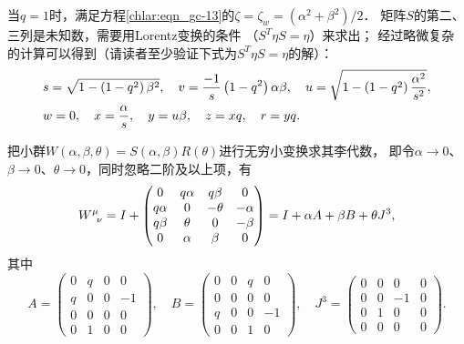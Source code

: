 当$q=1$时，满足方程\eqref{chlar:eqn_gc-13}的$\zeta=\zeta_w=(\alpha ^2 + \beta ^2)/2$．
矩阵$S$的第二、三列是未知数，需要用Lorentz变换的条件
（$S^T \eta S = \eta $）来求出；
经过略微复杂的计算可以得到（请读者至少验证下式为$S^T \eta S = \eta $的解）：
\begin{align}
	&s = \sqrt {1 - \left( {1 - {q^2}} \right){\beta ^2}}, \quad
	v = \frac{{ - 1}}{s}\left( {1 - {q^2}} \right)\alpha \beta , \quad
	u = \sqrt {1 - \left( {1 - {q^2}} \right)\frac{{{\alpha ^2}}}{{{s^2}}}},   \notag \\
	&w = 0,\quad x = \frac{\alpha }{s}, \quad y = u\beta,  \quad z = xq,\quad r = yq . 
	\label{chlar:eqn_gc-18}
\end{align}

把小群$W(\alpha,\beta,\theta) = S(\alpha,\beta)R(\theta)$进行无穷小变换求其李代数，
即令$\alpha  \to 0$、$\beta  \to 0$、$\theta  \to 0$，同时忽略二阶及以上项，有
\begin{equation}\label{chlar:eqn_gc-20}
	W^{\mu}_{\hphantom{\mu}\nu}= I + \begin{pmatrix}
		0&{q\alpha }&{q\beta }&0 \\
		{q\alpha }& 0&-\theta &{ - \alpha } \\
		{q\beta }&  {  \theta }&0&{ - \beta } \\
		0&  \alpha &\beta &0
	\end{pmatrix}
	= I + \alpha A + \beta B + \theta {J^3},
\end{equation}
其中
\begin{equation*} %
	A = \begin{pmatrix}
		0&q&0&0\\
		q&0&0&{ - 1} \\
		0&0&0&0 \\
		0&1&0&0
	\end{pmatrix},\quad B = \begin{pmatrix}
		0&0&q&0 \\
		0&0&0&0 \\
		q&0&0&{ - 1} \\
		0&0&1&0
	\end{pmatrix},\quad {J^3} = \begin{pmatrix}
		0&0&0&0 \\
		0&0&-1&0 \\
		0&{1}&0&0 \\
		0&0&0&0
	\end{pmatrix}.
\end{equation*}
